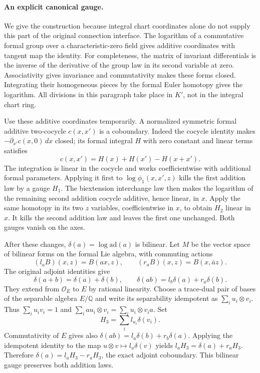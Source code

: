 \paragraph{An explicit canonical gauge.}
We give the construction because integral chart coordinates alone
do not supply this part of the original connection interface.
The logarithm of a commutative formal group over a characteristic-zero
field gives additive coordinates with tangent map the identity.
For completeness, the matrix of invariant differentials is the
inverse of the derivative of the group law in its second variable
at zero.  Associativity gives invariance and commutativity makes these
forms closed.  Integrating their homogeneous pieces by the formal
Euler homotopy gives the logarithm.  All divisions in this paragraph
take place in $K'$, not in the integral chart ring.

Use these additive coordinates temporarily.  A normalized symmetric
formal additive two-cocycle $c(x,x')$ is a coboundary.  Indeed the
cocycle identity makes
$-\partial_{x'}c(x,0)\,dx$ closed; its formal integral $H$ with zero
constant and linear terms satisfies
\[
                  c(x,x')=H(x)+H(x')-H(x+x').
\]
The integration is linear in the cocycle and works coefficientwise
with additional formal parameters.  Applying it first to
$\log\phi_1(x,x',z)$ kills the first addition law by a gauge $H_1$.
The biextension interchange law then makes the logarithm of the
remaining second addition cocycle additive, hence linear, in $x$.
Apply the same homotopy in its two $z$ variables, coefficientwise in
$x$, to obtain $H_2$ linear in $x$.  It kills the second addition
law and leaves the first one unchanged.  Both gauges vanish on the
axes.

After these changes, $\delta(a)=\log\mathrm{ad}(a)$ is bilinear.
Let $M$ be the vector space of bilinear forms on the formal Lie
algebra, with commuting actions
\[
        (l_a B)(x,z)=B(ax,z),\qquad
        (r_a B)(x,z)=B(x,\bar a z).
\]
The original adjoint identities give
\[
 \delta(a+b)=\delta(a)+\delta(b),\qquad
 \delta(ab)=l_b\delta(a)+r_a\delta(b).
\]
They extend from $\mathcal O_E$ to $E$ by rational linearity.
Choose a trace-dual pair of bases of the separable algebra
$E/\mathbb Q$ and write its separability idempotent as
$\sum_i u_i\otimes v_i$.  Thus $\sum_i u_iv_i=1$ and
$\sum_i au_i\otimes v_i=\sum_i u_i\otimes v_i a$.
Set
\[
                         H_3=\sum_i l_{u_i}\delta(v_i).
\]
Commutativity of $E$ gives also
$\delta(ab)=l_a\delta(b)+r_b\delta(a)$.
Applying the idempotent identity to the map
$u\otimes v\mapsto l_u\delta(v)$ yields
$l_aH_3=\delta(a)+r_aH_3$.  Therefore
$\delta(a)=l_aH_3-r_aH_3$, the exact adjoint coboundary.
This bilinear gauge preserves both addition laws.

